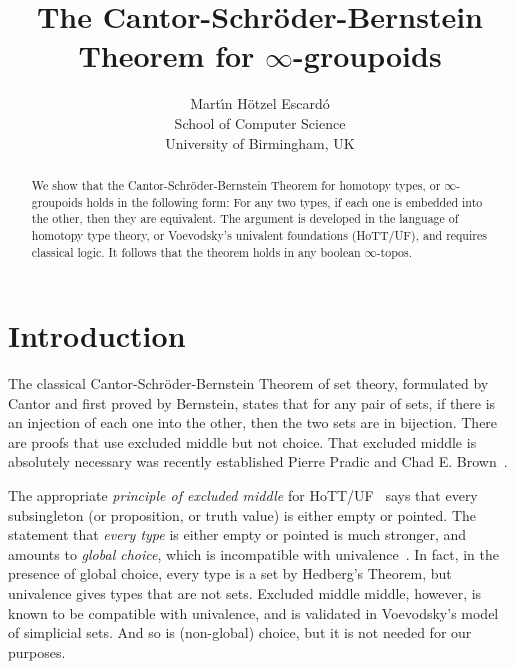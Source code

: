 \documentclass{article}
\title{The Cantor-Schr\"oder-Bernstein Theorem for $\infty$-groupoids}
\author{Mart\'{\i}n H\"otzel Escard\'o
  \\ {\small School of Computer Science}
  \\ {\small University of Birmingham, UK}}
\theoremstyle{definition}
\begin{document}
\maketitle

\begin{abstract}
  We show that the Cantor-Schr\"oder-Bernstein Theorem for homotopy
  types, or $\infty$-groupoids holds in the following form: For any
  two types, if each one is embedded into the other, then they are
  equivalent. The argument is developed in the language of homotopy
  type theory, or Voevodsky's univalent foundations (HoTT/UF), and
  requires classical logic. It follows that the theorem holds in any
  boolean $\infty$-topos.
\end{abstract}

\section{Introduction}

The classical Cantor-Schr\"oder-Bernstein Theorem of set theory, formulated by Cantor and first proved by Bernstein, states that for any pair of sets, if there is an injection of each one into the other, then the two sets are in bijection.
%
There are proofs that use excluded middle but not choice. That excluded middle is absolutely necessary was recently established Pierre Pradic and Chad E. Brown~\cite{pradic:brown}.

The appropriate \emph{principle of excluded middle} for HoTT/UF~\cite{hottbook} says that every subsingleton (or proposition, or truth value) is either empty or pointed. The statement that \emph{every type} is either empty or pointed is much stronger, and amounts to \emph{global choice}, which is incompatible with univalence~\cite[Theorem 3.2.2]{hottbook}. In fact, in the presence of global choice, every type is a set by Hedberg's Theorem, but univalence gives types that are not sets. Excluded middle middle, however, is known to be compatible with univalence, and is validated in Voevodsky's model of simplicial sets. And so is (non-global) choice, but it is not needed for our purposes.
\end{document}
